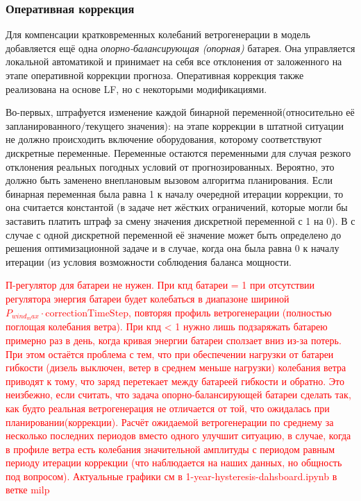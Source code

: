     \subsubsection{Оперативная коррекция}
        Для компенсации кратковременных колебаний ветрогенерации в модель добавляется ещё одна \textit{опорно-балансирующая (опорная)} батарея.
        Она управляется локальной автоматикой и принимает на себя все отклонения от заложенного на этапе оперативной коррекции прогноза.
        Оперативная коррекция также реализована на основе LF, но с некоторыми модификациями.
        
        Во-первых, штрафуется изменение каждой бинарной переменной(относительно её запланированного/текущего значения): 
        на этапе коррекции в штатной ситуации не должно происходить включение оборудования, которому соответствуют дискретные переменные.
        Переменные остаются переменными для случая резкого отклонения реальных погодных условий от прогнозированных. 
        Вероятно, это должно быть заменено внеплановым вызовом алгоритма планирования.
        Если бинарная переменная была равна 1 к началу очередной итерации коррекции, то она считается константой (в задаче нет жёстких ограничений, которые могли бы заставить платить штраф за смену значения дискретной переменной с 1 на 0).
        В с случае с одной дискретной переменной её значение может быть определено до решения оптимизационной задаче и в случае, когда она была равна 0 к началу итерации (из условия возможности соблюдения баланса мощности.
        
        
        \textcolor{red}{П-регулятор для батареи не нужен. 
        При кпд батареи = 1 при отсутствии регулятора энергия батареи будет колебаться в диапазоне шириной $P_{wind_max} \cdot \text{correctionTimeStep}$, повторяя профиль ветрогенерации (полностью поглощая колебания ветра). При кпд < 1 нужно лишь подзаряжать батарею примерно раз в день, когда кривая энергии батареи сползает вниз из-за потерь.
        При этом остаётся проблема с тем, что при обеспечении нагрузки от батареи гибкости (дизель выключен, ветер в среднем меньше нагрузки) колебания ветра приводят к тому, что заряд перетекает между батареей гибкости и обратно.
        Это неизбежно, если считать, что задача опорно-балансирующей батареи сделать так, как будто реальная ветрогенерация не отличается от той, что ожидалась при планировании(коррекции). 
        Расчёт ожидаемой ветрогенерации по среднему за несколько последних периодов вместо одного улучшит ситуацию, в случае, когда в профиле ветра есть колебания значительной амплитуды с периодом равным периоду итерации коррекции (что наблюдается на наших данных, но общность под вопросом). Актуальные графики см в 1-year-hysteresis-dahsboard.ipynb в ветке milp}
        
